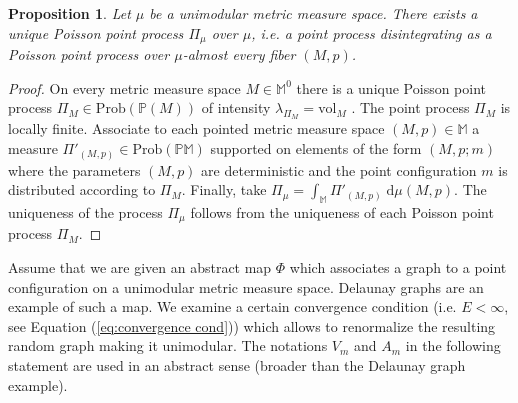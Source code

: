\documentclass{amsart}
\newcommand{\MM}{\mathbb{M}}
\newcommand{\MP}{\mathbb{PM}}
\newcommand{\Points}{\mathbb{P}}
\theoremstyle{plain}
\newtheorem{prop}[theorem]{Proposition}
\numberwithin{equation}{section}
\theoremstyle{definition}
\begin{document}
\begin{prop}
\label{prop:there exists a Poisson point process}
Let $\mu$ be a unimodular  metric measure space. There exists a unique Poisson point process $\Pi_\mu$ over $\mu$, i.e. a point process disintegrating as a Poisson point process over $\mu$-almost every fiber $(M,p)$.
\end{prop}
\begin{proof}
On every metric measure space $M \in \MM^0$  there is a unique Poisson point process $\Pi_M \in \mathrm{Prob}(\Points(M))$ of intensity $\lambda_{\Pi_M} = \mathrm{vol}_M$ \cite[Theorem 3.6]{last2017lectures}. The point process $\Pi_M$ is locally finite. Associate to each pointed metric measure space $(M,p) \in \MM$  a measure $\Pi'_{(M,p)} \in\mathrm{Prob}(\MP)$ supported on elements of the form $(M,p;m)$  where the parameters $(M,p)$ are deterministic and the point configuration $m$ is distributed according to $\Pi_M$. Finally, take $\Pi_\mu = \int_{\MM} \Pi'_{(M,p)} \; \mathrm{d}\mu(M,p)$. The uniqueness of the process $\Pi_\mu$ follows from the uniqueness of each  Poisson point process $\Pi_M$.
\end{proof}

Assume that we are given an abstract map $\Phi$ which associates a graph to a point configuration on a unimodular metric measure space. Delaunay graphs are an example of such a map. We examine a certain convergence condition (i.e. $E < \infty$, see Equation (\ref{eq:convergence cond})) which allows to renormalize the resulting random graph making it unimodular. The notations $V_m$ and $A_m$ in the following statement are used in an abstract sense (broader than the Delaunay graph example).
\end{document}
